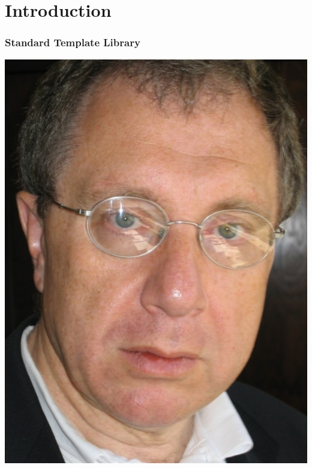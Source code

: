 \section{Introduction}
\begin{frame}
  \frametitle{Standard Template Library}
  \centering
  \includegraphics[height=0.7\textheight]{img/alex.jpg}
\end{frame}
